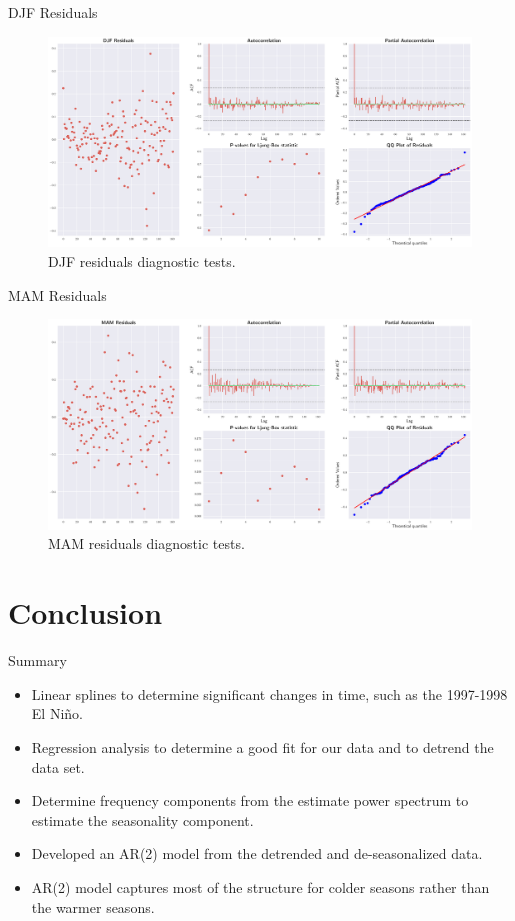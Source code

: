 \documentclass[10pt]{beamer}
\begin{document}
\begin{frame}{DJF Residuals}
	\begin{figure}[htbp]
		\includegraphics[scale=0.225,left]{djf_res}
		\caption{DJF residuals diagnostic tests.}
	\end{figure}
\end{frame}

\begin{frame}{MAM Residuals}
	\begin{figure}[htbp]
		\includegraphics[scale=0.225,left]{mam_res}
		\caption{MAM residuals diagnostic tests.}
	\end{figure}
\end{frame}

\section{Conclusion}
\begin{frame}{Summary}
\begin{itemize}
\item Linear splines to determine significant changes in time, such as the 1997-1998 El Niño.
\item Regression analysis to determine a good fit for our data and to detrend the data set.
\item Determine frequency components from the estimate power spectrum to estimate the seasonality component.
\item Developed an AR(2) model from the detrended and de-seasonalized data.
\item  AR(2) model captures most of the structure for colder seasons rather than the warmer seasons.
\end{itemize}

\end{frame}
\end{document}

